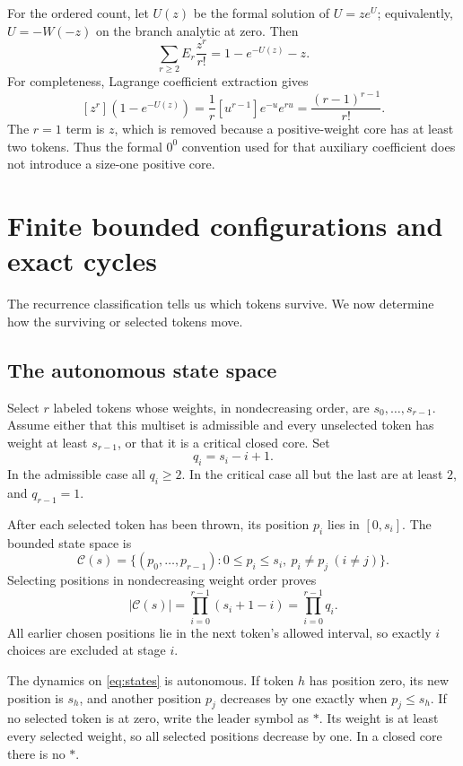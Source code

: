 \documentclass[11pt,letterpaper]{article}
\theoremstyle{definition}
\newcommand{\states}{\mathcal C}
\begin{document}
For the ordered count, let $U(z)$ be the formal solution of $U=ze^U$;
equivalently, $U=-W(-z)$ on the branch analytic at zero. Then
\begin{equation}\label{eq:core-egf}
 \sum_{r\ge2} E_r\frac{z^r}{r!}=1-e^{-U(z)}-z.
\end{equation}
For completeness, Lagrange coefficient extraction gives
\[
 [z^r](1-e^{-U(z)})
  =\frac1r[u^{r-1}]e^{-u}e^{ru}
  =\frac{(r-1)^{r-1}}{r!}.
\]
The $r=1$ term is $z$, which is removed because a positive-weight core has
at least two tokens. Thus the formal $0^0$ convention used for that auxiliary
coefficient does not introduce a size-one positive core.

\section{Finite bounded configurations and exact cycles}\label{sec:cycles}
The recurrence classification tells us which tokens survive. We now determine
how the surviving or selected tokens move.

\subsection{The autonomous state space}
Select $r$ labeled tokens whose weights, in nondecreasing order, are
$s_0,\ldots,s_{r-1}$. Assume either that this multiset is admissible and every
unselected token has weight at least $s_{r-1}$, or that it is a critical closed
core. Set
\begin{equation}\label{eq:q}
 q_i=s_i-i+1.
\end{equation}
In the admissible case all $q_i\ge2$. In the critical case all but the last
are at least $2$, and $q_{r-1}=1$.

After each selected token has been thrown, its position $p_i$ lies in
$[0,s_i]$. The bounded state space is
\begin{equation}\label{eq:states}
 \states(s)=\{(p_0,\ldots,p_{r-1}):0\le p_i\le s_i,
                              \ p_i\ne p_j\ (i\ne j)\}.
\end{equation}
Selecting positions in nondecreasing weight order proves
\begin{equation}\label{eq:statecount}
 |\states(s)|=\prod_{i=0}^{r-1}(s_i+1-i)=\prod_{i=0}^{r-1}q_i.
\end{equation}
All earlier chosen positions lie in the next token's allowed interval, so
exactly $i$ choices are excluded at stage $i$.

The dynamics on \eqref{eq:states} is autonomous. If token $h$ has position
zero, its new position is $s_h$, and another position $p_j$ decreases by one
exactly when $p_j\le s_h$. If no selected token is at zero, write the leader
symbol as $\ast$. Its weight is at least every selected weight, so all
selected positions decrease by one. In a closed core there is no $\ast$.
\end{document}
